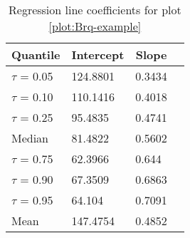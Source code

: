 %
\begin{table}[h]
\caption{Regression line coefficients for plot \ref{plot:Brq-example}}
\begin{center}
\begin{tabular}{llll}
\hline\hline
\multicolumn{1}{c}{Quantile}&\multicolumn{1}{c}{Intercept}&\multicolumn{1}{c}{Slope}\tabularnewline
\hline
$\tau$ = 0.05&124.8801&0.3434\tabularnewline
$\tau$ = 0.10&110.1416&0.4018\tabularnewline
$\tau$ = 0.25&95.4835&0.4741\tabularnewline
Median&81.4822&0.5602\tabularnewline
$\tau$ = 0.75&62.3966&0.644\tabularnewline
$\tau$ = 0.90&67.3509&0.6863\tabularnewline
$\tau$ = 0.95&64.104&0.7091\tabularnewline
Mean&147.4754&0.4852\tabularnewline
\hline
\end{tabular}
\end{center}
\label{table:Brq-example}
\end{table}

